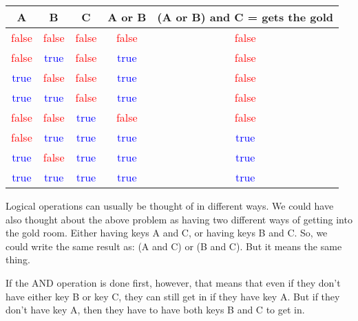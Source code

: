 \begin{center}
	\begin{tabular}{c | c | c | c | c}
		A & B & C & A or B & (A or B) and C = gets the gold\\ \hline
		\textcolor{red}{false} & \textcolor{red}{false} & \textcolor{red}{false} & \textcolor{red}{false} & \textcolor{red}{false}\\ \hline
		\textcolor{red}{false} & \textcolor{blue}{true} & \textcolor{red}{false} & \textcolor{blue}{true} & \textcolor{red}{false}\\ \hline
		\textcolor{blue}{true} & \textcolor{red}{false} & \textcolor{red}{false} & \textcolor{blue}{true} & \textcolor{red}{false}\\ \hline
		\textcolor{blue}{true} & \textcolor{blue}{true} & \textcolor{red}{false} & \textcolor{blue}{true} & \textcolor{red}{false}\\ \hline

		\textcolor{red}{false} & \textcolor{red}{false} & \textcolor{blue}{true} & \textcolor{red}{false} & \textcolor{red}{false}\\ \hline
		\textcolor{red}{false} & \textcolor{blue}{true} & \textcolor{blue}{true} & \textcolor{blue}{true} & \textcolor{blue}{true}\\ \hline
		\textcolor{blue}{true} & \textcolor{red}{false} & \textcolor{blue}{true} & \textcolor{blue}{true} & \textcolor{blue}{true}\\ \hline
		\textcolor{blue}{true} & \textcolor{blue}{true} & \textcolor{blue}{true} & \textcolor{blue}{true} & \textcolor{blue}{true}\\ \hline
	\end{tabular}
\end{center}

Logical operations can usually be thought of in different ways. We could have also thought about the above problem as having two different ways of getting into the gold room. Either having keys A and C, or having keys B and C. So, we could write the same result as: (A and C) or (B and C). But it means the same thing.

If the AND operation is done first, however, that means that even if they don't have either key B or key C, they can still get in if they have key A. But if they don't have key A, then they have to have both keys B and C to get in.\\

\begin{center} \end{center}

